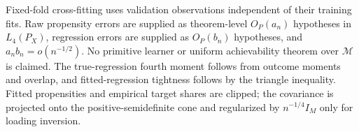Fixed-fold cross-fitting uses validation observations independent of their training fits. Raw propensity errors are supplied as theorem-level \(O_P(a_n)\) hypotheses in \(L_4(P_X)\), regression errors are supplied as \(O_P(b_n)\) hypotheses, and \(a_nb_n=o(n^{-1/2})\). No primitive learner or uniform achievability theorem over \(\mathcal M\) is claimed. The true-regression fourth moment follows from outcome moments and overlap, and fitted-regression tightness follows by the triangle inequality. Fitted propensities and empirical target shares are clipped; the covariance is projected onto the positive-semidefinite cone and regularized by \(n^{-1/4}I_M\) only for loading inversion.